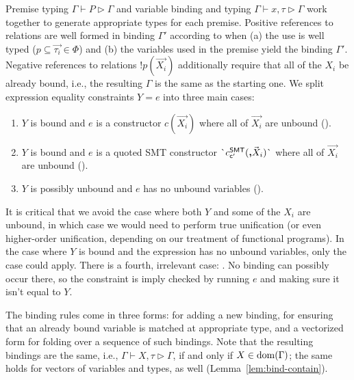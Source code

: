 \documentclass[acmsmall,screen,nonacm]{acmart}
\theoremstyle{definition}
\begin{document}
Premise typing $\Gamma \vdash P \rhd \Gamma$ and variable binding and typing
$\Gamma \vdash x,\tau \rhd \Gamma$ work together to generate appropriate types
for each premise.
%
Positive references to relations are well formed in binding $\Gamma'$ according
to  when (a) the use is well typed
($p \subseteq \vec{\tau_i} \in \Phi$) and (b) the variables used in
the premise yield the binding $\Gamma'$.
%
Negative references to relations $\mathord{!}p(\vec{X_i})$
additionally require that all of the $X_i$ be already bound, i.e., the
resulting $\Gamma$ is the same as the starting one.
%
We split expression equality constraints $Y = e$ into three main cases:
%
\begin{enumerate}
\item $Y$ is bound and $e$ is a constructor $c(\vec{X_i})$ where all of $\vec{X_i}$ are unbound ().
\item $Y$ is bound and $e$ is a quoted SMT constructor $\textsf{\`{}}{\ensuremath{c^\mathsf{SMT}_{\mathsf{c'}}}(\vec{\ensuremath{\textbf{,}{X_i}}})}\textsf{\`{}}$ where all of $\vec{X_i}$ are unbound ().
\item $Y$ is possibly unbound and $e$ has no unbound variables  ().
\end{enumerate}
%
It is critical that we avoid the case where both $Y$ and some of the
$X_i$ are unbound, in which case we would need to perform true
unification (or even higher-order unification, depending on our
treatment of functional programs).
%
In the case where $Y$ is bound and the expression has no unbound
variables, only the  case could apply.
%
There is a fourth, irrelevant case: . No binding can
possibly occur there, so the constraint is imply checked by running
$e$ and making sure it isn't equal to $Y$.

The binding rules come in three forms:  for adding a
new binding,  for ensuring that an already bound
variable is matched at appropriate type, and a vectorized
form  for folding over a sequence of such
bindings.
%
Note that the resulting bindings are the same, i.e., $\Gamma \vdash
X,\tau \rhd \Gamma$, if and only if $X \in \mathrm{dom}(\Gamma)$; the same
holds for vectors of variables and types, as well
(Lemma~\ref{lem:bind-contain}).
\end{document}
